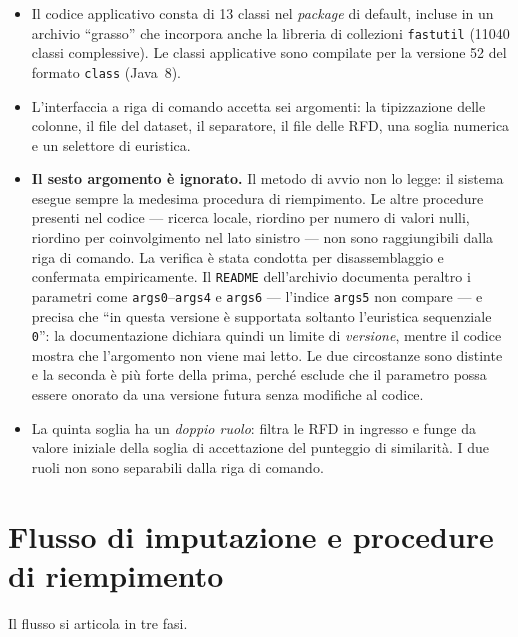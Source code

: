 \begin{itemize}[leftmargin=1.4em]
    \item Il codice applicativo consta di \num{13} classi nel \emph{package} di default, incluse
    in un archivio ``grasso'' che incorpora anche la libreria di collezioni \texttt{fastutil}
    (\num{11040} classi complessive). Le classi applicative sono compilate per la versione
    \num{52} del formato \texttt{class} (Java~8).
    \item L'interfaccia a riga di comando accetta sei argomenti: la tipizzazione delle colonne,
    il file del dataset, il separatore, il file delle RFD, una soglia numerica e un selettore
    di euristica.
    \item \textbf{Il sesto argomento è ignorato.} Il metodo di avvio non lo legge: il sistema
    esegue sempre la medesima procedura di riempimento. Le altre procedure presenti nel codice
    --- ricerca locale, riordino per numero di valori nulli, riordino per coinvolgimento nel
    lato sinistro --- non sono raggiungibili dalla riga di comando. La verifica è stata condotta
    per disassemblaggio e confermata empiricamente. Il \texttt{README} dell'archivio documenta
    peraltro i parametri come \texttt{args0}--\texttt{args4} e \texttt{args6} --- l'indice
    \texttt{args5} non compare --- e precisa che ``in questa versione è supportata soltanto
    l'euristica sequenziale \texttt{0}'': la documentazione dichiara quindi un limite di
    \emph{versione}, mentre il codice mostra che l'argomento non viene mai letto. Le due
    circostanze sono distinte e la seconda è più forte della prima, perché esclude che il
    parametro possa essere onorato da una versione futura senza modifiche al codice.
    \item La quinta soglia ha un \emph{doppio ruolo}: filtra le RFD in ingresso e funge da
    valore iniziale della soglia di accettazione del punteggio di similarità. I due ruoli non
    sono separabili dalla riga di comando.
\end{itemize}

\section{Flusso di imputazione e procedure di riempimento}\label{sec:workflow}\label{sec:two-branches}

Il flusso si articola in tre fasi.

